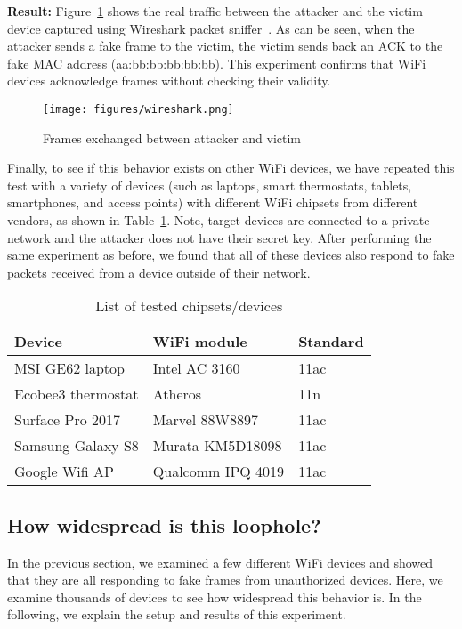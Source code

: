 \vspace{0.05in}
\noindent
\textbf{Result:} Figure~\ref{fig:wireshark} shows the real traffic between the attacker and the victim device captured using Wireshark packet sniffer~\cite{wireshark}. As can be seen, when the attacker sends a fake frame to the victim, the victim sends back an ACK to the fake MAC address (aa:bb:bb:bb:bb:bb). This experiment confirms that WiFi devices acknowledge  frames without checking their validity. 
\begin{figure}[t!]
        \centering
        \texttt{[image: figures/wireshark.png]}
        \caption{Frames exchanged between attacker and victim} 
        \label{fig:wireshark}
\end{figure}  
Finally, to see if this behavior exists on other WiFi devices, we have repeated this test with a variety of devices (such as laptops, smart thermostats, tablets, smartphones, and access points) with different WiFi chipsets from different vendors, as shown in Table~\ref{tbl:controled-devices}. Note, target devices are connected to a private network and the attacker does not have their secret key. After performing the same experiment as before, we found that all of these devices also respond to fake packets received from a device outside of their network.

\begin{table}[t]
\centering
\begin{tabular}{|l|l|l|}
     \hline
     Device & WiFi module & Standard  \\
     \hline
     MSI GE62 laptop&Intel AC 3160 & 11ac\\
     Ecobee3 thermostat& Atheros & 11n\\
     Surface Pro 2017& Marvel 88W8897 & 11ac\\
     Samsung Galaxy S8 & Murata KM5D18098 & 11ac\\
     Google Wifi AP &  Qualcomm IPQ 4019 & 11ac\\
     \hline
\end{tabular}
\caption{List of tested chipsets/devices}
\label{tbl:controled-devices}
\end{table}

\subsection{How widespread is this loophole?}\label{sec:testing}
In the previous section, we examined a few different WiFi devices and showed that they are all responding to fake frames from unauthorized devices. Here, we examine thousands of devices to see how widespread this behavior is. In the following, we explain the setup and results of this experiment. 

